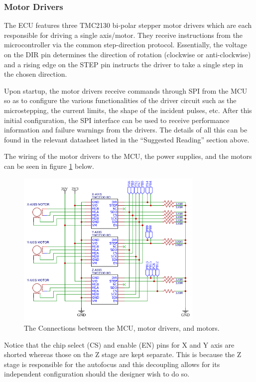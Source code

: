 \subsubsection{Motor Drivers}

The ECU features three TMC2130 bi-polar stepper motor drivers which are each responsible for driving a single axis/motor. They receive instructions from the microcontroller via the common step-direction protocol. Essentially, the voltage on the DIR pin determines the direction of rotation (clockwise or anti-clockwise) and a rising edge on the STEP pin instructs the driver to take a single step in the chosen direction.

Upon startup, the motor drivers receive commands through SPI from the MCU so as to configure the various functionalities of the driver circuit such as the microstepping, the current limits, the shape of the incident pulses, etc. After this initial configuration, the SPI interface can be used to receive performance information and failure warnings from the drivers. The details of all this can be found in the relevant datasheet listed in the “Suggested Reading” section above.

The wiring of the motor drivers to the MCU, the power supplies, and the motors can be seen in figure \ref{fig:motor-MCU} below.

\begin{figure}
\centering
\includegraphics[width=0.8\textwidth]{Primary-ECU/figs/motor-MCU.png}
\caption{\label{fig:motor-MCU}The Connections between the MCU, motor drivers, and motors.}
\end{figure}

Notice that the chip select (CS) and enable (EN) pins for X and Y axis are shorted whereas those on the Z stage are kept separate. This is because the Z stage is responsible for the autofocus and this decoupling allows for its independent configuration should the designer wish to do so.





